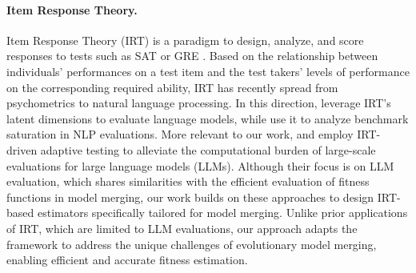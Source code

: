\paragraph{Item Response Theory.}
Item Response Theory (IRT) \citep{cai2016item, van2018handbook, brzezinska2020item, lord1968statistical} is a paradigm to design, analyze, and score responses to tests such as SAT or GRE \citep{an2014item, kingston1982feasibility, petersen1982using}. Based on the relationship between individuals' performances on a test item and the test takers' levels of performance on the corresponding required ability, IRT has recently spread from psychometrics to natural language processing. In this direction, \citet{lalor2016building} leverage IRT's latent dimensions to evaluate language models, while \citet{vania2021comparing} use it to analyze benchmark saturation in NLP evaluations. 
More relevant to our work, \citet{zhuang2023efficiently} and \citet{tinybenchmarks} employ IRT-driven adaptive testing to alleviate the computational burden of large-scale evaluations for large language models (LLMs). Although their focus is on LLM evaluation, which shares similarities with the efficient evaluation of fitness functions in model merging, our work builds on these approaches to design IRT-based estimators specifically tailored for model merging. Unlike prior applications of IRT, which are limited to LLM evaluations, our approach adapts the framework to address the unique challenges of evolutionary model merging, enabling efficient and accurate fitness estimation.
